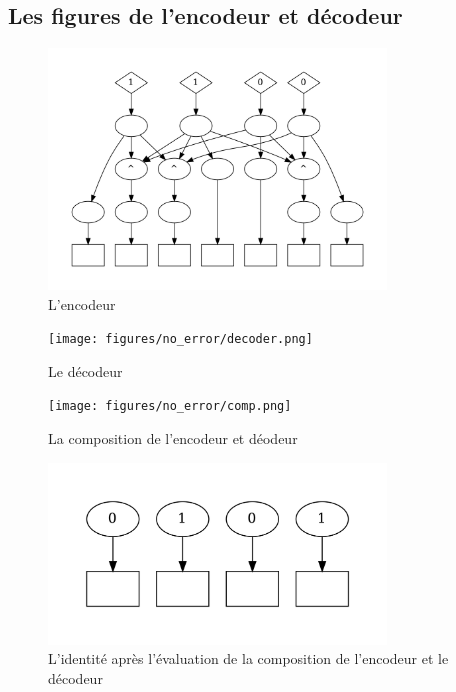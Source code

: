 \documentclass[a4paper,12pt]{article}
\begin{document}
\subsection{Les figures de l'encodeur et décodeur}
\begin{figure}[H]
    \centering
    \includegraphics[width=0.8\textwidth]{figures/no_error/encoder.png}
    \caption{L'encodeur}
    \label{fig:encoder-no-error}
\end{figure}

\begin{figure}[H]
    \centering
    \texttt{[image: figures/no\_error/decoder.png]}
    \caption{Le décodeur}
    \label{fig:decoder-no-error}
\end{figure}

\begin{figure}[H]
    \centering
    \texttt{[image: figures/no\_error/comp.png]}
    \caption{La composition de l'encodeur et déodeur}
    \label{fig:compos-enc-dec-no-error}
\end{figure}

\begin{figure}[H]
    \centering
    \includegraphics[width=0.8\textwidth]{figures/no_error/encoder_decoder_compose.png}
    \caption{L'identité après l'évaluation de la composition de l'encodeur et le décodeur}
    \label{fig:enc-dec-identity}
\end{figure}
\end{document}
